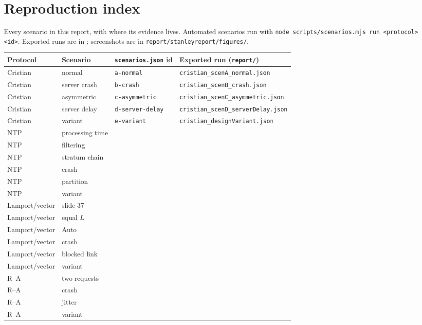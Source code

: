 \section{Reproduction index}\label{app:repro}
Every scenario in this report, with where its evidence lives.
Automated scenarios run with
\texttt{node scripts/scenarios.mjs run <protocol> <id>}.
Exported runs are in ; screenshots are in
\nolinkurl{report/stanleyreport/figures/}.

\begin{table}[H]\centering\small
\begin{tabularx}{\linewidth}{@{}lllX@{}}
\toprule
Protocol & Scenario & \nolinkurl{scenarios.json} id & Exported run (\nolinkurl{report/}) \\ \midrule
Cristian & normal          & \texttt{a-normal}       & \nolinkurl{cristian_scenA_normal.json} \\
Cristian & server crash    & \texttt{b-crash}        & \nolinkurl{cristian_scenB_crash.json} \\
Cristian & asymmetric      & \texttt{c-asymmetric}   & \nolinkurl{cristian_scenC_asymmetric.json} \\
Cristian & server delay    & \texttt{d-server-delay} & \nolinkurl{cristian_scenD_serverDelay.json} \\
Cristian & variant         & \texttt{e-variant}      & \nolinkurl{cristian_designVariant.json} \\
\midrule
NTP & processing time & \TODO{} & \TODO{} \\
NTP & filtering       & \TODO{} & \TODO{} \\
NTP & stratum chain   & \TODO{} & \TODO{} \\
NTP & crash           & \TODO{} & \TODO{} \\
NTP & partition       & \TODO{} & \TODO{} \\
NTP & variant         & \TODO{} & \TODO{} \\
\midrule
Lamport/vector & slide 37     & \TODO{} & \TODO{} \\
Lamport/vector & equal $L$    & \TODO{} & \TODO{} \\
Lamport/vector & Auto         & \TODO{} & \TODO{} \\
Lamport/vector & crash        & \TODO{} & \TODO{} \\
Lamport/vector & blocked link & \TODO{} & \TODO{} \\
Lamport/vector & variant      & \TODO{} & \TODO{} \\
\midrule
R--A & two requests  & \TODO{} & \TODO{} \\
R--A & crash         & \TODO{} & \TODO{} \\
R--A & jitter        & \TODO{} & \TODO{} \\
R--A & variant       & \TODO{} & \TODO{} \\
\bottomrule
\end{tabularx}
\end{table}
